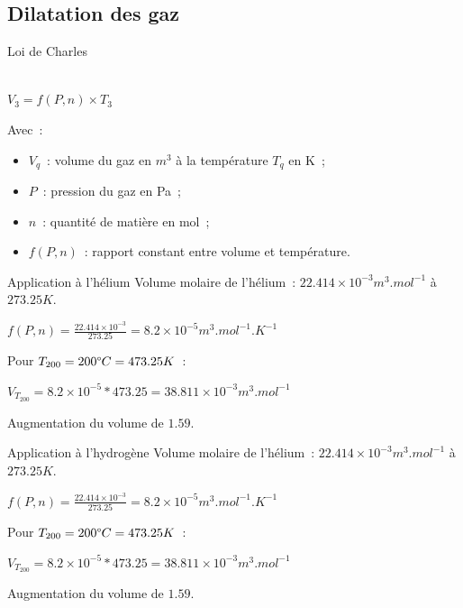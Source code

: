 \documentclass{beamer}
\begin{document}
\subsection{Dilatation des gaz}

\begin{frame}{Loi de Charles}
  \begin{center}
     \\
    $\displaystyle{V_3 = f(P, n) \times T_3}$
  \end{center}
  Avec~:
  \begin{itemize}
    \item $V_q$~: volume du gaz en $m^3$ à la température $T_q$ en K~;
    \item $P$~: pression du gaz en Pa~;
    \item $n$~: quantité de matière en mol~;
    \item $f(P, n)$~: rapport constant entre volume et température.
  \end{itemize}
\end{frame}

\begin{frame}{Application à l'hélium}
  Volume molaire de l'hélium~: $22.414\times 10^{-3} m^3.mol^{-1}$ à $273.25K$.
  \begin{center}
    $\displaystyle{f(P, n) = \frac{22.414\times 10^{-3}}{273.25} = 8.2\times 10^{-5} m^3.mol^{-1}.K^{-1}}$
  \end{center}
  Pour $T_{200} = 200 \degree C = 473.25 K$~:
  \begin{center}
    $\displaystyle{V_{T_{200}} = 8.2\times 10^{-5} * 473.25 = 38.811 \times 10^{-3}} m^3.mol^{-1}$
  \end{center}
  Augmentation du volume de $1.59$.
\end{frame}

\begin{frame}{Application à l'hydrogène}
  Volume molaire de l'hélium~: $22.414\times 10^{-3} m^3.mol^{-1}$ à $273.25K$.
  \begin{center}
    $\displaystyle{f(P, n) = \frac{22.414\times 10^{-3}}{273.25} = 8.2\times 10^{-5} m^3.mol^{-1}.K^{-1}}$
  \end{center}
  Pour $T_{200} = 200 \degree C = 473.25 K$~:
  \begin{center}
    $\displaystyle{V_{T_{200}} = 8.2\times 10^{-5} * 473.25 = 38.811 \times 10^{-3}} m^3.mol^{-1}$
  \end{center}
  Augmentation du volume de $1.59$.
\end{frame}
\end{document}
